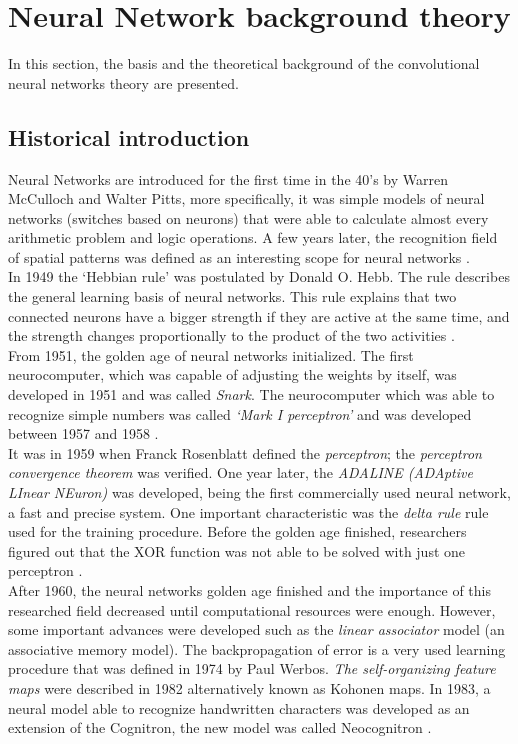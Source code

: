 \section{Neural Network background theory}
In this section, the basis and the theoretical background of the convolutional neural networks theory are presented.

\subsection{Historical introduction}
Neural Networks are introduced for the first time in the 40's by Warren McCulloch and Walter Pitts, more specifically, it was simple models of neural networks (switches based on neurons) that were able to calculate almost every arithmetic problem and logic operations. A few years later, the recognition field of spatial patterns was defined as an interesting scope for neural networks \cite{BINN}.\\

In 1949 the `Hebbian rule' was postulated by Donald O. Hebb. The rule describes the general learning basis of neural networks. This rule explains that two connected neurons have  a bigger strength if they are active at the same time, and the strength changes proportionally to the product of the two activities \cite{BINN}.\\

From 1951, the golden age of neural networks initialized. The first neurocomputer, which was capable of adjusting the weights by itself, was developed in 1951 and was called \textit{Snark}. The neurocomputer which was able to recognize simple numbers was called \textit{`Mark I perceptron'} and was developed between 1957 and 1958 \cite{BINN}.\\

It was in 1959 when Franck Rosenblatt defined the \textit{perceptron}; the \textit{perceptron convergence theorem} was verified. One year later, the \textit{ADALINE (ADAptive LInear NEuron)} was developed, being the first commercially used neural network, a fast and precise system. One important characteristic was the \textit{delta rule} rule used for the training procedure. Before the golden age finished, researchers figured out that the XOR function was not able to be solved with just one perceptron \cite{BINN}.\\

After 1960, the neural networks golden age finished and the importance of this researched field decreased until computational resources were enough. However,  some important advances were developed such as the \textit{linear associator} model (an associative memory model). The backpropagation of error is a very used learning procedure that was defined in 1974 by Paul Werbos. \textit{The self-organizing feature maps} were described in 1982 alternatively known as Kohonen maps. In 1983, a neural model able to recognize handwritten characters was developed as an extension of the Cognitron, the new model was called Neocognitron \cite{BINN}.\\

